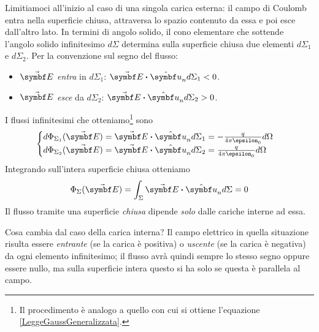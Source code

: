 Limitiamoci all'inizio al caso di una singola carica esterna: il campo di Coulomb entra nella superficie chiusa, attraversa lo spazio contenuto da essa e poi esce dall'altro lato. In termini di angolo solido, il cono elementare che sottende l'angolo solido infinitesimo $d\Sigma$ determina sulla superficie chiusa due elementi $d\Sigma_1$ e $d\Sigma_2$. Per la convenzione sul segno del flusso:
\begin{itemize}
	\item $\vba{E}$ \textit{entra} in $d\Sigma_1$: $\vba{E}\vdot \vbh{u}_n d\Sigma_1<0$.
	\item $\vba{E}$ \textit{esce} da $d\Sigma_2$: $\vba{E}\vdot \vbh{u}_n d\Sigma_2>0$.
\end{itemize}
I flussi infinitesimi che otteniamo\footnote{Il procedimento è analogo a quello con cui si ottiene l'equazione \eqref{LeggeGaussGeneralizzata}.} sono
\begin{equation*}
	\begin{cases}
		d\Phi_{\Sigma_1}(\vba{E})=\vba{E}\vdot \vbh{u}_n d\Sigma_1=-\frac{q}{4\pi\epsilon_0}d\Omega\\
		d\Phi_{\Sigma_2}(\vba{E})=\vba{E}\vdot \vbh{u}_n d\Sigma_2=\frac{q}{4\pi\epsilon_0}d\Omega
	\end{cases}
\end{equation*}
Integrando sull'intera superficie chiusa otteniamo
\begin{equation}
	\Phi_\Sigma(\vba{E})=\int_{\Sigma}\vba{E}\vdot\vbh{u}_nd\Sigma=0
\end{equation}
Il flusso tramite una superficie \textit{chiusa} dipende \textit{solo} dalle cariche interne ad essa.
\begin{observe}
	Cosa cambia dal caso della carica interna? Il campo elettrico in quella situazione risulta essere \textit{entrante} (se la carica è positiva) o \textit{uscente} (se la carica è negativa) da ogni elemento infinitesimo; il flusso avrà quindi sempre lo stesso segno oppure essere nullo, ma sulla superficie intera questo si ha solo se questa è parallela al campo.   
\end{observe}
